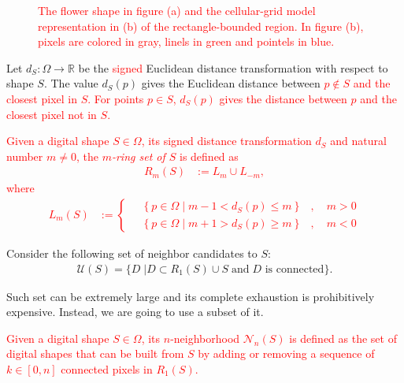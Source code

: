 \documentclass[smallextended]{svjour3}       %
\newcommand{\revision}[1]{\textcolor{red}{#1}}
\begin{document}
\begin{figure}[h!]
{	}
	\caption{\revision{The flower shape in figure (a) and the cellular-grid model representation in (b) of the rectangle-bounded region. In figure (b), pixels are colored in gray, linels in green and pointels in blue.}}
	\label{fig:cellular-grid-model}
\end{figure}


Let $d_{S}:\Omega \rightarrow \mathbb{R}$ be the \revision{signed} Euclidean distance transformation with respect to shape $S$. The value $d_S(p)$ gives the Euclidean distance between \revision{$p \notin S$ and the closest pixel in $S$. For points $p \in S$, $d_S(p)$ gives the distance between $p$ and the closest pixel not in $S$.}


\begin{definition}
\revision{
Given a digital shape $S\in\Omega$, its signed distance transformation $d_S$ and natural number $m \neq 0$, the {\em $m$-ring set of $S$} is defined as
\begin{align*}
	R_m(S) &:= L_m \cup L_{-m},
\end{align*}
where
\begin{align*}
	L_m(S) &:= \left\{ \quad \begin{array}{cc}
		\left\{ p \in \Omega \; | \; m-1 < d_S(p) \leq m \right\} & , \quad m>0\\
		\left\{ p \in \Omega \; | \; m+1 > d_S(p) \geq m \right\} & , \quad m<0
		\end{array} \right.
\end{align*}}
\end{definition}

Consider the following set of neighbor candidates to $S$:
\begin{align*}
\mathcal{U}(S) = \{ D \; | D \subset R_1(S) \cup S \; \text{and} \; \text{$D$ is connected} \}.
\end{align*}


Such set can be extremely large and its complete exhaustion is prohibitively expensive.  Instead, we are going to use a subset of it.

\begin{definition}[$n$-neighborhood]
\revision{
	Given a digital shape $S \in \Omega$, its $n$-neigh\-bor\-hood $\mathcal{N}_n(S)$ is defined as the set of digital shapes that can be built from $S$ by adding or removing a sequence of $k \in [0,n]$ connected pixels in $R_1(S)$.
}
\end{definition}
\end{document}
